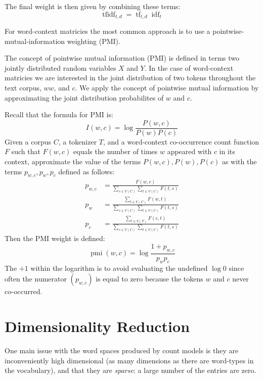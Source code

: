 \begin{definition}
  The final weight is then given by combining these terms:
  \begin{equation}
    \operatorname{tfidf}_{t,d}=\operatorname{tf}_{t,d}\operatorname{idf}_t
  \end{equation}
\end{definition}

For word-context matricies the most common approach is to use a pointwise-mutual-information weighting (PMI).

The concept of pointwise mutual information (PMI) is defined in terms two jointly distributed random variables $X$ and $Y$. In the case of word-context matricies we are interested in the joint distribution of two tokens throughout the text corpus, $ww$, and $c$. We apply the concept of pointwise mutual information by approximating the joint distribution probabilites of $w$ and $c$.

\begin{definition}
  Recall that the formula for PMI is:
  \begin{equation*}
    I(w,c)=\log\frac{P(w,c)}{P(w)P(c)}
  \end{equation*}
  Given a corpus $C$, a tokenizer $T$, and a word-context co-occurrence count function $F$ such that $F(w,c)$ equals the number of times $w$ appeared with $c$ in its context, approximate the value of the terms $P(w,c), P(w), P(c)$ as with the terms $p_{w,c}, p_w, p_c$ defined as follows:
  \begin{align}
    p_{w,c}&=\frac{F(w,c)}{\sum_{s\in V(C)}\sum_{t\in V(C)}F(t,s)}\\[0.5em]
    p_{w}&=\frac{\sum_{t\in V(C)}F(w,t)}{\sum_{s\in V(C)}\sum_{t\in V(C)}F(t,s)}\\[0.5em]
    p_{c}&=\frac{\sum_{t\in V(T)}F(c,t)}{\sum_{s\in V(C)}\sum_{t\in V(C)}F(t,s)}
  \end{align}
  Then the PMI weight is defined:
  \begin{equation}
    \operatorname{pmi} (w, c)=\log\frac{1 + p_{w,c}}{p_w p_c}
  \end{equation}
  The $+1$ within the logarithm is to avoid evaluating the undefined $\log 0$ since often the numerator $(p_{w,c})$ is equal to zero because the tokens $w$ and $c$ never co-occurred.
\end{definition}

\section{Dimensionality Reduction}
One main issue with the word spaces produced by count models is they are inconveniently high dimensional (as many dimensions as there are word-types in the vocabulary), and that they are \emph{sparse}: a large number of the entries are zero.

